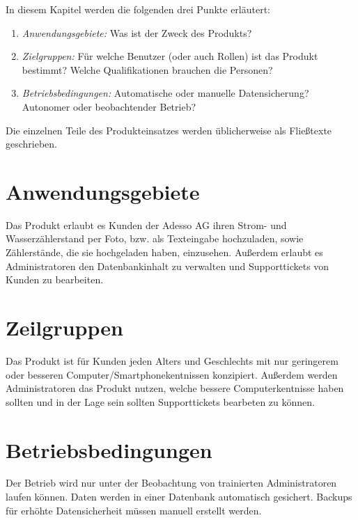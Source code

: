 \begin{tcolorbox}
	In diesem Kapitel werden die folgenden drei Punkte erläutert:
	\begin{enumerate}
		\item \textit{Anwendungsgebiete:} Was ist der Zweck des Produkts?
		\item \textit{Zielgruppen:} Für welche Benutzer (oder auch Rollen) ist das Produkt bestimmt?
		Welche Qualifikationen brauchen die Personen?
		\item \textit{Betriebsbedingungen:} Automatische oder manuelle Datensicherung? 	Autonomer oder beobachtender Betrieb? 	
	\end{enumerate}
	
	\noindent Die einzelnen Teile des Produkteinsatzes werden üblicherweise als Fließtexte geschrieben.
	\end{tcolorbox}
	
	\section{Anwendungsgebiete}
	
	Das Produkt erlaubt es Kunden der Adesso AG ihren Strom- und Wasserzählerstand per Foto, bzw. als Texteingabe hochzuladen, sowie Zählerstände, die sie hochgeladen haben, einzusehen.
	Außerdem erlaubt es Administratoren den Datenbankinhalt zu verwalten und Supporttickets von Kunden zu bearbeiten.
	
	\section{Zeilgruppen}
	
	Das Produkt ist für Kunden jeden Alters und Geschlechts mit nur geringerem oder besseren Computer/Smartphonekentnissen konzipiert.
	Außerdem werden Administratoren das Produkt nutzen, welche bessere Computerkentnisse haben sollten und in der Lage sein sollten Supporttickets bearbeten zu können.
	
	\section{Betriebsbedingungen}
	
	Der Betrieb wird nur unter der Beobachtung von trainierten Administratoren laufen können. Daten werden in einer Datenbank automatisch gesichert. Backups für erhöhte Datensicherheit müssen manuell erstellt werden.